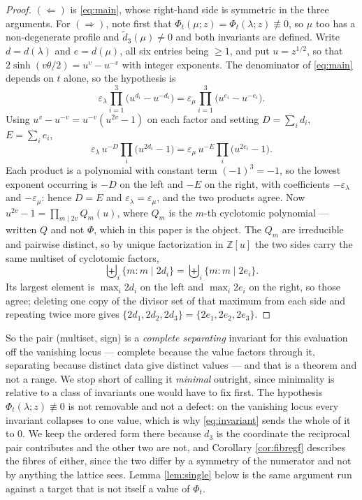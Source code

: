 \documentclass[11pt,reqno]{amsart}
\theoremstyle{plain}
\theoremstyle{definition}
\newcommand{\ZZ}{\mathbb{Z}}
\begin{document}
\begin{proof}
$(\Leftarrow)$ is \eqref{eq:main}, whose right-hand side is symmetric in the three arguments. For
$(\Rightarrow)$, note first that $\Phi_t(\mu;z)=\Phi_t(\lambda;z)\not\equiv0$, so $\mu$ too has a
non-degenerate profile and $\tilde d_3(\mu)\ne0$ and both invariants are defined. Write
$d=d(\lambda)$ and $e=d(\mu)$, all six entries being $\ge1$, and put
$u=z^{1/2}$, so that $2\sinh(v\theta/2)=u^{v}-u^{-v}$ with integer exponents. The
denominator of \eqref{eq:main} depends on $t$ alone, so the hypothesis is
\[
\varepsilon_\lambda\prod_{i=1}^{3}\bigl(u^{d_i}-u^{-d_i}\bigr)
=\varepsilon_\mu\prod_{i=1}^{3}\bigl(u^{e_i}-u^{-e_i}\bigr).
\]
Using $u^{v}-u^{-v}=u^{-v}(u^{2v}-1)$ on each factor and setting $D=\sum_id_i$, $E=\sum_ie_i$,
\[
\varepsilon_\lambda\,u^{-D}\prod_{i}\bigl(u^{2d_i}-1\bigr)
=\varepsilon_\mu\,u^{-E}\prod_{i}\bigl(u^{2e_i}-1\bigr).
\]
Each product is a polynomial with constant term $(-1)^3=-1$, so the lowest exponent occurring is
$-D$ on the left and $-E$ on the right, with coefficients $-\varepsilon_\lambda$ and
$-\varepsilon_\mu$: hence $D=E$ and $\varepsilon_\lambda=\varepsilon_\mu$, and the two products
agree. Now $u^{2v}-1=\prod_{m\mid2v}Q_m(u)$, where $Q_m$ is the $m$-th cyclotomic polynomial ---
written $Q$ and not $\Phi$, which in this paper is the object. The $Q_m$ are
irreducible and pairwise distinct, so by unique factorization in $\ZZ[u]$ the two sides carry the
same multiset of cyclotomic factors,
\[
\biguplus_i\{m:m\mid 2d_i\}=\biguplus_i\{m:m\mid 2e_i\} .
\]
Its largest element is $\max_i2d_i$ on the left and $\max_i2e_i$ on the right, so those agree;
deleting one copy of the divisor set of that maximum from each side and repeating twice more gives
$\{2d_1,2d_2,2d_3\}=\{2e_1,2e_2,2e_3\}$.
\end{proof}

\noindent So the pair (multiset, sign) is a \emph{complete separating} invariant for this evaluation
off the vanishing locus --- complete because the value factors through it, separating because
distinct data give distinct values --- and that is a theorem and not a range. We stop short of
calling it \emph{minimal} outright, since minimality is relative to a class of invariants one would
have to fix first. The hypothesis $\Phi_t(\lambda;z)\not\equiv0$ is not
removable and not a defect: on the vanishing locus every invariant collapses to one value, which is
why \eqref{eq:invariant} sends the whole of it to $0$. We keep the ordered form there
because $d_3$ is the coordinate the reciprocal pair contributes and the other two are not, and
Corollary \ref{cor:fibregf} describes the fibres of either, since the two differ by a symmetry of
the numerator and not by anything the lattice sees. Lemma \ref{lem:single} below is the same
argument run against a target that is not itself a value of $\Phi_t$.
\end{document}
